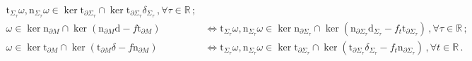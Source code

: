 \begin{lemm}
\begin{align*}
	\mathrm{t}_{\Sigma_\tau}\omega,\mathrm{n}_{\Sigma_\tau}\omega\in
	\ker\mathrm{t}_{\partial\Sigma_\tau}\cap\ker\mathrm{t}_{\partial\Sigma_\tau}\delta_{\Sigma_\tau}\,,\forall \tau\in\mathbb{R}\,;\\
	\omega\in\ker\mathrm{n}_{\partial M}\cap\ker(\mathrm{n}_{\partial M}\mathrm{d}-f\mathrm{t}_{\partial M})&\Longleftrightarrow
	\mathrm{t}_{\Sigma_\tau}\omega,\mathrm{n}_{\Sigma_\tau}\omega\in
	\ker\mathrm{n}_{\partial\Sigma_\tau}\cap\ker(\mathrm{n}_{\partial\Sigma_\tau}\mathrm{d}_{\Sigma_\tau}-f_t\mathrm{t}_{\partial\Sigma_\tau})\,,\forall \tau\in\mathbb{R}\,;\\
	\omega\in\ker\mathrm{t}_{\partial M}\cap\ker(\mathrm{t}_{\partial M}\delta-f\mathrm{n}_{\partial M})&\Longleftrightarrow
	\mathrm{t}_{\Sigma_\tau}\omega,\mathrm{n}_{\Sigma_\tau}\omega\in
	\ker\mathrm{t}_{\partial\Sigma_\tau}\cap\ker(\mathrm{t}_{\partial\Sigma_\tau}\delta_{\Sigma_\tau}-f_t\mathrm{n}_{\partial\Sigma_\tau})\,,\forall t \in\mathbb{R}\,.
	\end{align*}
\end{lemm}
